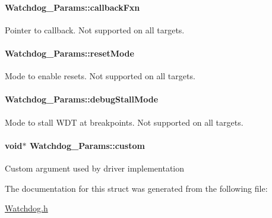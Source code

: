 \paragraph[{callback\+Fxn}]{ Watchdog\+\_\+\+Params\+::callback\+Fxn}\label{struct_watchdog___params_a710aaa2504356ab3d3f9a27ac19ddb85}
Pointer to callback. Not supported on all targets. 
\paragraph[{reset\+Mode}]{ Watchdog\+\_\+\+Params\+::reset\+Mode}\label{struct_watchdog___params_a94b5d650f8beb7dce719360404039ccf}
Mode to enable resets. Not supported on all targets. 
\paragraph[{debug\+Stall\+Mode}]{ Watchdog\+\_\+\+Params\+::debug\+Stall\+Mode}\label{struct_watchdog___params_abe7792eef8afa2972a4625f428b7241b}
Mode to stall W\+D\+T at breakpoints. Not supported on all targets. 
\paragraph[{custom}]{\setlength{\rightskip}{0pt plus 5cm}void$\ast$ Watchdog\+\_\+\+Params\+::custom}\label{struct_watchdog___params_aa2d75e83d9cb6bf71400934b709ec234}
Custom argument used by driver implementation 

The documentation for this struct was generated from the following file\+:\begin{DoxyCompactItemize}
\item 
\hyperlink{_watchdog_8h}{Watchdog.\+h}\end{DoxyCompactItemize}
